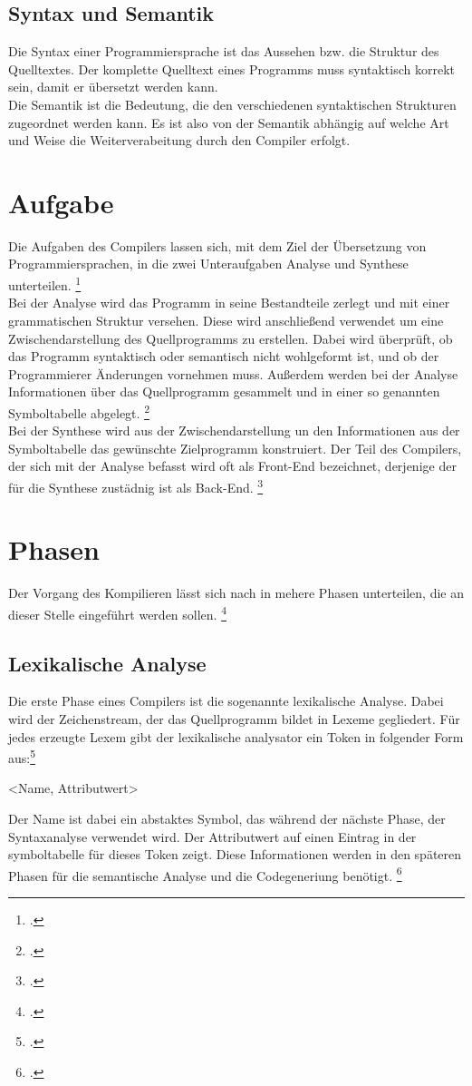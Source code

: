 \subsection{ Syntax und Semantik}
Die Syntax einer Programmiersprache ist das Aussehen bzw. die Struktur des Quelltextes. Der komplette Quelltext eines Programms muss syntaktisch korrekt sein, damit er übersetzt werden kann.  \\
Die Semantik ist die Bedeutung, die den verschiedenen syntaktischen Strukturen zugeordnet werden kann. Es ist also von der Semantik abhängig auf welche Art und Weise die Weiterverabeitung durch den Compiler erfolgt. 




\section{Aufgabe}
Die Aufgaben des Compilers lassen sich, mit dem Ziel der Übersetzung von Programmiersprachen, in die zwei Unteraufgaben Analyse und Synthese unterteilen. \footcite[Vgl.][S. 6]{Ullmann2008}\\
Bei der Analyse wird das Programm in seine Bestandteile zerlegt und mit einer grammatischen Struktur versehen. Diese wird anschließend verwendet um eine Zwischendarstellung des Quellprogramms zu erstellen. Dabei wird überprüft, ob das Programm syntaktisch oder semantisch nicht wohlgeformt ist, und ob der Programmierer Änderungen vornehmen muss. Außerdem werden bei der Analyse Informationen über das Quellprogramm gesammelt und in einer so genannten Symboltabelle abgelegt.  \footcite[Vgl.][S. 6f]{Ullmann2008}\\
Bei der Synthese wird aus der Zwischendarstellung un den Informationen aus der Symboltabelle das gewünschte Zielprogramm konstruiert. Der Teil des Compilers, der sich mit der Analyse befasst wird oft als Front-End bezeichnet, derjenige der für die Synthese zustädnig ist als Back-End.  \footcite[Vgl.][S. 7]{Ullmann2008}
\section{Phasen}
Der Vorgang des Kompilieren lässt sich nach \citeauthor{Ullmann2008} in mehere Phasen unterteilen, die an dieser Stelle eingeführt werden sollen. \footcite[Vgl.][S. 6]{Ullmann2008}
\subsection{Lexikalische Analyse}
Die erste Phase eines Compilers ist die sogenannte lexikalische Analyse. Dabei wird der Zeichenstream, der das Quellprogramm bildet in Lexeme gegliedert. Für jedes erzeugte Lexem gibt der lexikalische analysator ein Token in folgender Form aus:\footcite[Vgl.][S. 7f]{Ullmann2008}
\begin{center}
 <Name, Attributwert>
\end{center}
Der Name ist dabei ein abstaktes Symbol, das während der nächste Phase, der Syntaxanalyse verwendet wird. Der Attributwert auf einen Eintrag in der symboltabelle für dieses Token zeigt. Diese Informationen werden in den späteren Phasen für die semantische Analyse und die Codegeneriung benötigt. \footcite[Vgl.][S. 7f]{Ullmann2008}
